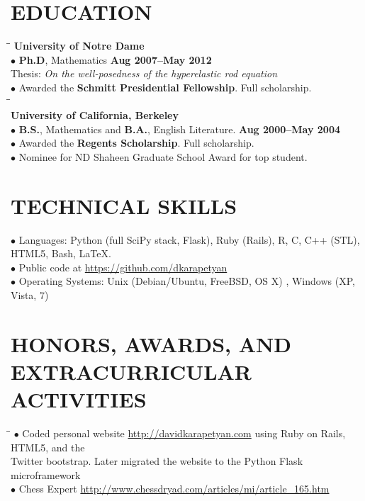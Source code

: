 \documentclass{resume}
\begin{document}
\begin{resume}
\section{EDUCATION} 
\vspace{-0.05mm}
\begin{tabbing}
\hspace{2.3in}\= \hspace{2.6in}\= \kill
\textbf{University of Notre Dame} \\
$\bullet$ \textbf{Ph.D}, Mathematics \>\>\textbf{Aug 2007--May 2012}
\\ 
Thesis: \textit{On the well-posedness of the hyperelastic rod equation} \\
$\bullet$ Awarded the \textbf{Schmitt Presidential Fellowship}. Full scholarship. \\
\hspace{2.3in}\= \hspace{2.6in}\= \kill
\\
\textbf{University of California, Berkeley}
\\
$\bullet$ \textbf{B.S.}, Mathematics  and  \textbf{B.A.}, English Literature.
\>\>\textbf{Aug 2000--May 2004}
\\
$\bullet$ Awarded the \textbf{Regents Scholarship}. Full scholarship.
\\
$\bullet$ Nominee for ND Shaheen Graduate School Award for top student.
\end{tabbing}
\section{TECHNICAL SKILLS}
\vspace{-0.05mm}
\begin{tabbing}
$\bullet$ Languages: Python (full SciPy stack, Flask), Ruby (Rails), R, C, C++
(STL), HTML5, Bash, \LaTeX{}.
\\
$\bullet$ Public code at \url{https://github.com/dkarapetyan}
\\
$\bullet$ Operating Systems: Unix (Debian/Ubuntu, FreeBSD, OS X) , Windows (XP, Vista, 7) 
\end{tabbing}

\section{HONORS, AWARDS, AND EXTRACURRICULAR ACTIVITIES} 
\vspace{-0.05mm}
\begin{tabbing}
\hspace{2.3in}\= \hspace{2.6in}\= \kill
$\bullet$ Coded personal website \url{http://davidkarapetyan.com} using Ruby on 
Rails, HTML5, and the \\  \phantom{$\bullet$} Twitter bootstrap. Later migrated
the website to the Python Flask microframework
\\
$\bullet$ Chess Expert \url{http://www.chessdryad.com/articles/mi/article_165.htm}
\end{tabbing}
\end{resume}
%
\end{document}
